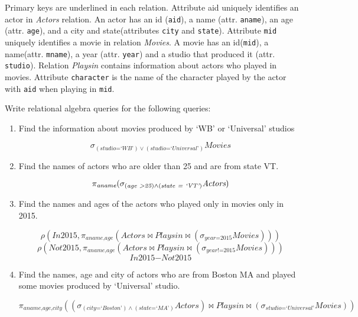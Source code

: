 \documentclass[letterpaper, 11pt]{article}
\begin{document}
Primary keys are underlined in each relation. Attribute aid uniquely identifies an actor in \textit{Actors} relation. An actor has an id (\texttt{aid}), a name (attr. \texttt{aname}), an age (attr. \texttt{age}), and a city and state(attributes \texttt{city} and \texttt{state}). Attribute \texttt{mid} uniquely identifies a movie in relation \textit{Movies}. A movie has an id(\texttt{mid}), a name(attr. \texttt{mname}), a year (attr. \texttt{year}) and a studio that produced it (attr. \texttt{studio}). Relation \textit{Playsin} contains information about actors who played in movies. Attribute \texttt{character} is the name of the character played by the actor with \texttt{aid} when playing in \texttt{mid}.

Write relational algebra queries for the following queries:
\begin{enumerate}[label={\alph*}),leftmargin=*]
    \item Find the information about movies produced by `WB' or `Universal' studios
    \begin{tcolorbox}
    \[\sigma_{(\textit{studio=`WB'}) \vee (\textit{studio=`Universal'})}\textit{Movies}\]    
    \end{tcolorbox}
    \item Find the names of actors who are older than 25 and are from state VT.
    \begin{tcolorbox}
    \[\pi_{\textit{aname}}(\sigma_{(\textit{age \textgreater 25}) \wedge (\textit{state = `VT'})}\textit{Actors})\]
    \end{tcolorbox}    
    \item Find the names and ages of the actors who played only in movies only in 2015.
    \begin{tcolorbox}
    \[\rho(\textit{In2015}, \pi_{\textit{aname,age}}(\textit{Actors} \bowtie \textit{Playsin} \bowtie (\sigma_{\textit{year=2015}}\textit{Movies})))\]
    \[\rho(\textit{Not2015}, \pi_{\textit{aname,age}}(\textit{Actors} \bowtie \textit{Playsin} \bowtie (\sigma_{\textit{year!=2015}}\textit{Movies})))\]
    \[\textit{In2015} - \textit{Not2015}\]
    \end{tcolorbox}    
    \item Find the names, age and city of actors who are from Boston MA and played some movies produced by `Universal' studio.
    \begin{tcolorbox}
    \[\pi_{\textit{aname,age,city}}((\sigma_{(\textit{city=`Boston'})\wedge (\textit{state=`MA'})}\textit{Actors}) \bowtie \textit{Playsin} \bowtie (\sigma_{\textit{studio=`Universal'}}\textit{Movies}))\]

\end{tcolorbox}
\end{enumerate}
\end{document}

